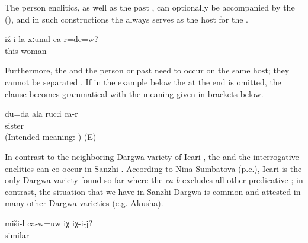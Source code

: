 The person enclitics, as well as the past , can optionally be accompanied by the  (), and in such constructions the  always serves as the host for the  . 

%
\begin{exe}
	\ex	\label{ex:‎‎‎Are you his wife}
	\gll	iž-i-la	xːunul	ca-r=de=w?\\
		this	woman	\\
	\glt	{}
\end{exe}

Furthermore, the  and the person  or past  need to occur on the same host; they cannot be separated . If in the example below the  at the end is omitted, the clause becomes grammatical with the meaning given in brackets below. 
%
\begin{exe}
	\ex	\label{ex:It is me who is your sister.}
	\gll	{*} du=da	ala	rucːi	ca-r\\
		{} 		sister	\\
	\glt	(Intended meaning: ) (E)
\end{exe}

In contrast to the neighboring Dargwa variety of Icari \citep[138]{Sumbatova.Mutalov2003}, the  and the interrogative enclitics can co-occur in Sanzhi . According to Nina Sumbatova (p.c.), Icari is the only Dargwa variety found so far where the  \textit{ca-b} excludes all other predicative ; in contrast, the situation that we have in Sanzhi Dargwa is common and attested in many other Dargwa varieties (e.g. Akusha). 

\begin{exe}
	\ex	\label{ex:Is this similar to himSyntax}
	\gll	miši-l	ca-w=uw	iχ	iχ-i-j?\\
		similar		\tsc{dem.down}	\\
	\glt	{}
\end{exe}

